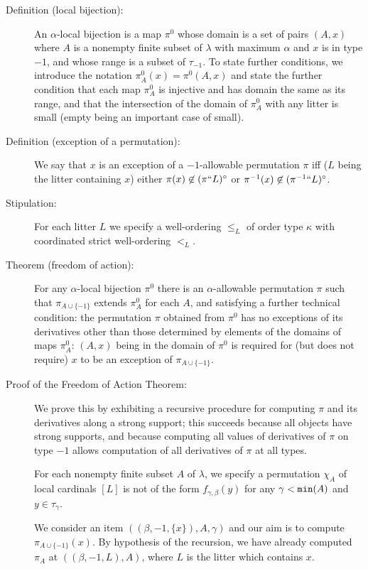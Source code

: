 \begin{description}

\item[Definition (local bijection):]  An $\alpha$-local bijection is a map $\pi^0$ whose domain is a set of pairs $(A,x)$ where $A$ is a nonempty finite subset of $\lambda$ with maximum $\alpha$ and $x$ is in type $-1$,  and whose range is a subset of $\tau_{-1}$.  To state further conditions, we introduce the notation $\pi^0_A(x) = \pi^0(A,x)$ and state the further condition that each map $\pi^0_A$ is injective and has domain the same as its range, and that the intersection of the domain of $\pi^0_A$ with any litter is small (empty being an important case of small).

\item[Definition (exception of a permutation):]  We say that $x$ is an exception of a $-1$-allowable permutation $\pi$ iff ($L$ being the litter containing $x$) either $\pi(x) \not\in (\pi``L)^\circ$ or $\pi^{-1}(x) \not\in ({\pi^{-1}}``L)^\circ$.

\item[Stipulation:]  For each litter $L$ we specify a well-ordering $\leq_L$ of order type $\kappa$ with coordinated strict well-ordering $<_L$.

\item[Theorem (freedom of action):]  For any $\alpha$-local bijection $\pi^0$ there is an $\alpha$-allowable permutation $\pi$ such that
$\pi_{A\cup \{-1\}}$ extends $\pi^0_A$ for each $A$, and satisfying a further technical condition:    the permutation $\pi$ obtained from $\pi^0$ has no exceptions of its derivatives other than those determined by elements of the domains of maps $\pi^0_A$:  $(A,x)$ being in the domain of $\pi^0$ is required for (but does not require) $x$ to be an exception of $\pi_{A \cup \{-1\}}$.

\item[Proof of the Freedom of Action Theorem:]  We prove this by exhibiting a recursive procedure for computing $\pi$ and its derivatives along a strong support;  this succeeds because all objects have
strong supports, and because computing all values of derivatives of $\pi$ on type $-1$ allows computation of all derivatives of $\pi$ at all types.

For each nonempty finite subset $A$ of $\lambda$, we specify a permutation $\chi_A$ of local cardinals $[L]$ is not of the form $f_{\gamma,\beta}(y)$ for any $\gamma<{\tt min}(A)$ and $y \in \tau_\gamma$.

We consider an item $((\beta,-1,\{x\}),A,\gamma)$ and our aim is to compute $\pi_{A \cup \{-1\}}(x)$.  By hypothesis of the recursion, we have already
computed $\pi_A$ at $((\beta,-1,L),A)$, where $L$ is the litter which contains $x$.


\end{description}
